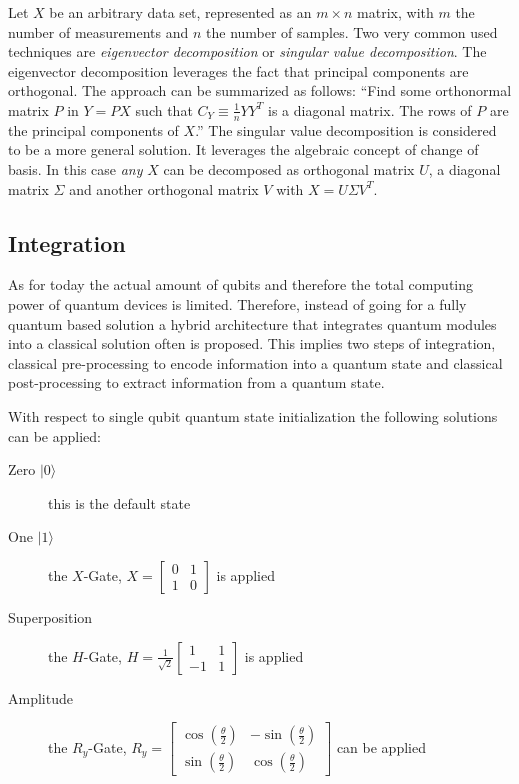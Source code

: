 Let $X$ be an arbitrary data set, represented as an $m \times n$ matrix, with $m$ the number of measurements and $n$ the number of samples. Two very common used techniques are \emph{eigenvector decomposition} or \emph{singular value decomposition}. The eigenvector decomposition leverages the fact that principal components are orthogonal. The approach can be summarized as follows: \enquote{Find some orthonormal matrix $P$ in $Y = PX$ such that $C_Y \equiv \frac{1}{n} YY^T$ is a diagonal matrix. The rows of $P$ are the principal components of $X$.} \cite[p. 6]{Shlen_2014} The singular value decomposition is considered to be a more general solution. It leverages the algebraic concept of change of basis. In this case \emph{any} $X$ can be decomposed as orthogonal matrix $U$, a diagonal matrix $\Sigma$ and another orthogonal matrix $V$ with $X = U\Sigma V^T$. \cite[p. 7]{Shlen_2014}

\subsection{Integration}
\label{subsec:integration}
As for today the actual amount of qubits and therefore the total computing power of quantum devices is limited. Therefore, instead of going for a fully quantum based solution a hybrid architecture that integrates quantum modules into a classical solution often is proposed. This implies two steps of integration, classical pre-processing to encode information into a quantum state and classical post-processing to extract information from a quantum state.

With respect to single qubit quantum state initialization the following solutions can be applied:
\begin{description}
  \item [Zero $|0\rangle$] this is the default state
  \item [One $|1\rangle$] the $X$-Gate, $X = \begin{bmatrix}0 & 1 \\ 1 & 0\end{bmatrix}$ is applied
  \item [Superposition] the $H$-Gate, $H = \frac{1}{\sqrt{2}}\begin{bmatrix}1 & 1 \\ -1 & 1\end{bmatrix}$ is applied
  \item [Amplitude] the $R_y$-Gate, $R_y = \begin{bmatrix}\cos(\frac{\theta}{2}) & -\sin(\frac{\theta}{2}) \\ \sin(\frac{\theta}{2}) & \cos(\frac{\theta}{2})\end{bmatrix}$ can be applied
\end{description}

